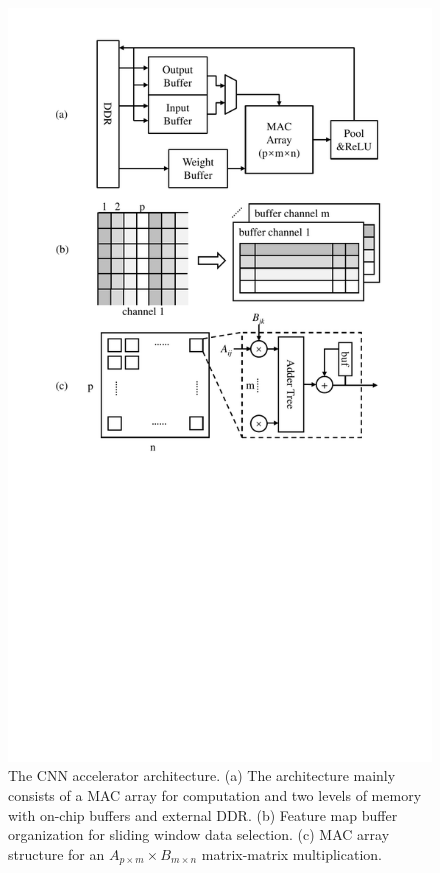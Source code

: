 \documentclass[10pt, conference]{IEEEtran}
\begin{document}
    \begin{figure}[t]
      \centering
      \includegraphics[width=1\columnwidth]{fig/arch.pdf}
      \caption{The CNN accelerator architecture. (a) The architecture mainly consists of a MAC array for computation and two levels of memory with on-chip buffers and external DDR. (b) Feature map buffer organization for sliding window data selection. (c) MAC array structure for an $A_{p\times m}\times B_{m\times n}$ matrix-matrix multiplication.}
      \vspace{-15pt}
      \label{fig:arch}
    \end{figure}
    
\end{document}
